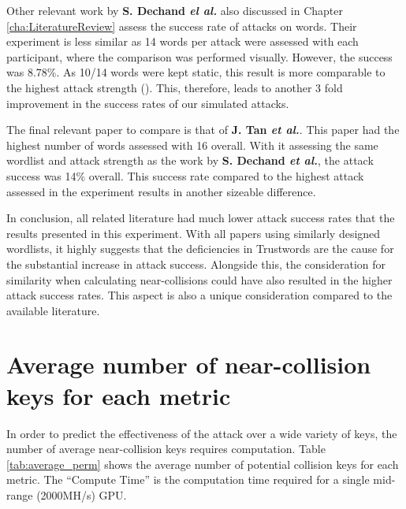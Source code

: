 Other relevant work by \textbf{S. Dechand \textit{el al.}}\cite{dechand2016empirical} also discussed in Chapter \ref{cha:LiteratureReview} assess the success rate of attacks on words. Their experiment is less similar as 14 words per attack were assessed with each participant, where the comparison was performed visually. However, the success was 8.78\%. As 10/14 words were kept static, this result is more comparable to the highest attack strength (\XOOX). This, therefore, leads to another 3 fold improvement in the success rates of our simulated attacks. 

The final relevant paper to compare is that of \textbf{J. Tan \textit{et al.}}\cite{tan2017can}. This paper had the highest number of words assessed with 16 overall. With it assessing the same wordlist and attack strength as the work by \textbf{S. Dechand \textit{et al.}}\cite{dechand2016empirical}, the attack success was 14\% overall. This success rate compared to the highest attack assessed in the experiment results in another sizeable difference.

In conclusion, all related literature had much lower attack success rates that the results presented in this experiment. With all papers using similarly designed wordlists, it highly suggests that the deficiencies in Trustwords are the cause for the substantial increase in attack success. Alongside this, the consideration for similarity when calculating near-collisions could have also resulted in the higher attack success rates. This aspect is also a unique consideration compared to the available literature.

\section{Average number of near-collision keys for each metric}
\label{sec:averagePerms}
In order to predict the effectiveness of the attack over a wide variety of keys, the number of average near-collision keys requires computation. Table \ref{tab:average_perm} shows the average number of potential collision keys for each metric. The ``Compute Time'' is the computation time required for a single mid-range (2000MH/s) GPU.

